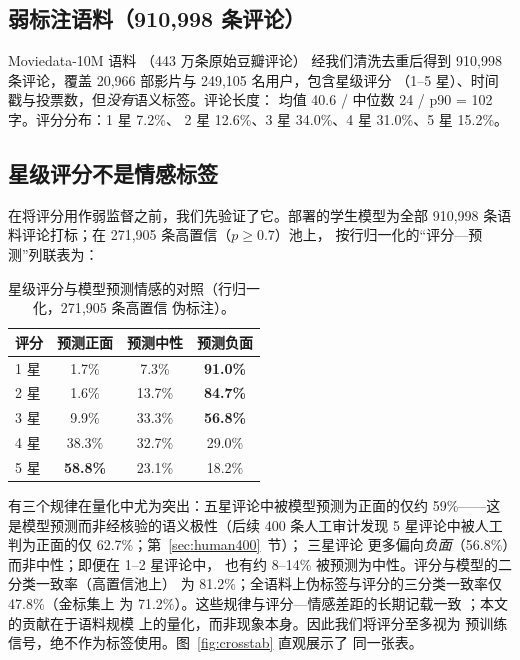 \documentclass[11pt,a4paper]{article}
\begin{document}
\subsection{弱标注语料（910{,}998 条评论）}

Moviedata-10M 语料 \citep{douban2024}（443 万条原始豆瓣评论）
经我们清洗去重后得到 910{,}998 条评论，覆盖 20{,}966 部影片与
249{,}105 名用户，包含星级评分
（1--5 星）、时间戳与投票数，但\emph{没有}语义标签。评论长度：
均值 40.6 / 中位数 24 / p90 = 102 字。评分分布：1 星 7.2\%、
2 星 12.6\%、3 星 34.0\%、4 星 31.0\%、5 星 15.2\%。

\subsection{星级评分不是情感标签}
\label{sec:ratings}

在将评分用作弱监督之前，我们先验证了它。部署的学生模型为全部
910{,}998 条语料评论打标；在 271{,}905 条高置信（$p \ge 0.7$）池上，
按行归一化的“评分—预测”列联表为：

\begin{table}[H]
\centering\small
\caption{星级评分与模型预测情感的对照（行归一化，271{,}905 条高置信
伪标注）。}
\label{tab:crosstab}
\begin{tabular}{lccc}
\toprule
评分 & 预测正面 & 预测中性 & 预测负面 \\
\midrule
1 星 & 1.7\%  & 7.3\%  & \textbf{91.0\%} \\
2 星 & 1.6\%  & 13.7\% & \textbf{84.7\%} \\
3 星 & 9.9\%  & 33.3\% & \textbf{56.8\%} \\
4 星 & 38.3\% & 32.7\% & 29.0\% \\
5 星 & \textbf{58.8\%} & 23.1\% & 18.2\% \\
\bottomrule
\end{tabular}
\end{table}

有三个规律在量化中尤为突出：五星评论中被模型预测为正面的仅约
59\%——这是模型预测而非经核验的语义极性（后续 400 条人工审计发现
5 星评论中被人工判为正面的仅 62.7\%；第~\ref{sec:human400}~节）；
三星评论
更多偏向\emph{负面}（56.8\%）而非中性；即便在 1--2 星评论中，
也有约 8--14\% 被预测为中性。评分与模型的二分类一致率（高置信池上）
为 81.2\%；全语料上伪标签与评分的三分类一致率仅 47.8\%（金标集上
为 71.2\%）。这些规律与评分—情感差距的长期记载一致
\citep{pang2005seeing,abaiyan2026stars}；本文的贡献在于语料规模
上的量化，而非现象本身。因此我们将评分至多视为
预训练信号，绝不作为标签使用。图~\ref{fig:crosstab} 直观展示了
同一张表。
\end{document}
